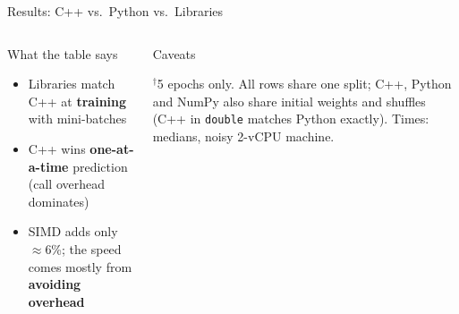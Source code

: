 \documentclass[aspectratio=169]{beamer}
\newenvironment{eq}[1]{\begin{minipage}[t][#1][t]{\linewidth}\raggedright\hyphenpenalty=10000 }{\end{minipage}}
\begin{document}
\begin{frame}{Results: C++ vs.\ Python vs.\ Libraries}
  \vspace{0.15cm}
  \begin{columns}[T]
      \begin{block}{\scriptsize What the table says}
\begin{eq}{2.0cm}
        \scriptsize
        \begin{itemize}
          \item Libraries match C++ at \textbf{training} with mini-batches
          \item C++ wins \textbf{one-at-a-time} prediction (call overhead dominates)
          \item SIMD adds only $\approx$6\%; the speed comes mostly from \textbf{avoiding overhead}
        \end{itemize}
      \end{eq}
      \end{block}
      \begin{alertblock}{\scriptsize Caveats}
\begin{eq}{2.0cm}
        \scriptsize
        $^{\dagger}$5 epochs only. All rows share one split; C++, Python and NumPy also share initial weights
        and shuffles (C++ in \texttt{double} matches Python exactly). Times: medians, noisy 2-vCPU machine.
      \end{eq}
      \end{alertblock}
  \end{columns}
\end{frame}
\end{document}

